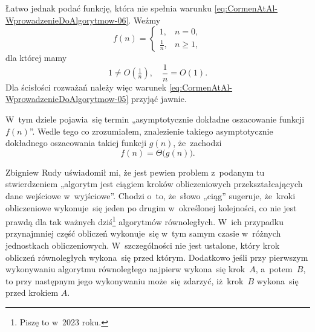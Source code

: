 \documentclass[a4paper,11pt]{article}
\numberwithin{equation}{section}
\begin{document}
Łatwo jednak podać funkcję, która nie spełnia warunku
\eqref{eq:CormenAtAl-WprowadzenieDoAlgorytmow-06}. Weźmy
\begin{equation}
  \label{eq:CormenAtAl-WprowadzenieDoAlgorytmow-07}
  f( n ) =
  \begin{cases}
    1, & n = 0, \\
    \frac{ 1 }{ n }, & n \geq 1,
  \end{cases}
\end{equation}
dla której mamy
\begin{equation}
  \label{eq:CormenAtAl-WprowadzenieDoAlgorytmow-08}
  1 \neq O\!\left( \tfrac{ 1 }{ n } \right), \quad
  \frac{ 1 }{ n } = O( 1 ).
\end{equation}
Dla ścisłości rozważań należy więc warunek
\eqref{eq:CormenAtAl-WprowadzenieDoAlgorytmow-05} przyjąć jawnie.

\VerSpaceFour





\noindent
W~tym dziele pojawia~się termin „asymptotycznie dokładne oszacowanie funkcji
$f( n )$”. Wedle tego co zrozumiałem, znalezienie takiego asymptotycznie
dokładnego oszacowania takiej funkcji $g( n )$, że~zachodzi
\begin{equation}
  \label{eq:CormenAtAl-WprowadzenieDoAlgorytmow-09}
  f( n ) = \Theta\big( g( n ) \big).
\end{equation}










\noindent
{} Zbigniew Rudy uświadomił mi, że jest pewien problem
z~podanym tu stwierdzeniem „algorytm jest ciągiem kroków obliczeniowych
przekształcających dane wejściowe w~wyjściowe”. Chodzi o~to, że~słowo
„ciąg” sugeruje, że~kroki obliczeniowe wykonuje~się jeden po drugim
w~określonej kolejności, co nie jest prawdą dla tak ważnych
dziś\footnote{Piszę to w~2023 roku.} algorytmów równoległych. W~ich przypadku
przynajmniej część obliczeń wykonuje~się w~tym samym czasie w~różnych
jednostkach obliczeniowych. W~szczególności nie jest ustalone, który krok
obliczeń równoległych wykona~się przed którym. Dodatkowo jeśli przy
pierwszym wykonywaniu algorytmu równoległego najpierw wykona~się krok~$A$,
a~potem~$B$, to przy następnym jego wykonywaniu może~się zdarzyć, iż~krok~$B$
wykona~się przed krokiem $A$.
\end{document}
